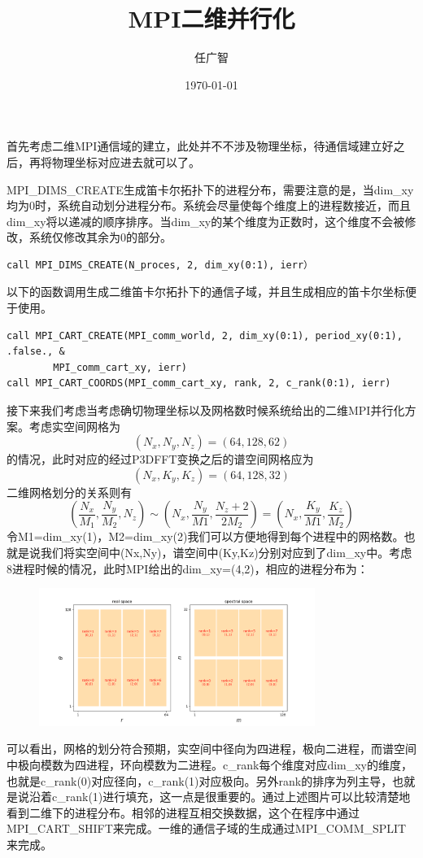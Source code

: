 \documentclass[11pt,a4paper]{article}
\title{MPI二维并行化}
\author{任广智}
\date{\today}
\begin{document}
	
\maketitle

首先考虑二维MPI通信域的建立，此处并不不涉及物理坐标，待通信域建立好之后，再将物理坐标对应进去就可以了。

MPI_DIMS_CREATE生成笛卡尔拓扑下的进程分布，需要注意的是，当dim_xy均为0时，系统自动划分进程分布。系统会尽量使每个维度上的进程数接近，而且dim_xy将以递减的顺序排序。当dim_xy的某个维度为正数时，这个维度不会被修改，系统仅修改其余为0的部分。
\begin{lstlisting}
call MPI_DIMS_CREATE(N_proces, 2, dim_xy(0:1), ierr）
\end{lstlisting}

以下的函数调用生成二维笛卡尔拓扑下的通信子域，并且生成相应的笛卡尔坐标便于使用。
\begin{lstlisting}
call MPI_CART_CREATE(MPI_comm_world, 2, dim_xy(0:1), period_xy(0:1), .false., &
		MPI_comm_cart_xy, ierr)
call MPI_CART_COORDS(MPI_comm_cart_xy, rank, 2, c_rank(0:1), ierr)
\end{lstlisting}

接下来我们考虑当考虑确切物理坐标以及网格数时候系统给出的二维MPI并行化方案。考虑实空间网格为$$(N_x,N_y,N_z)=(64,128,62)$$的情况，此时对应的经过P3DFFT变换之后的谱空间网格应为$$(N_x,K_y,K_z)=(64,128,32)$$
二维网格划分的关系则有
$$(\frac{N_x}{M_1},\frac{N_y}{M_2},N_z) \sim (N_x,\frac{N_y}{M1},\frac{N_z+2}{2M_2})=(N_x,\frac{K_y}{M1},\frac{K_z}{M_2})$$
令M1=dim_xy(1)，M2=dim_xy(2)我们可以方便地得到每个进程中的网格数。也就是说我们将实空间中(Nx,Ny)，谱空间中(Ky,Kz)分别对应到了dim_xy中。考虑8进程时候的情况，此时MPI给出的dim_xy=(4,2)，相应的进程分布为：
\begin{figure}[H]
	\centering
	\includegraphics[width=0.8\textwidth]{./np8.png}
	\caption{}
\end{figure}
可以看出，网格的划分符合预期，实空间中径向为四进程，极向二进程，而谱空间中极向模数为四进程，环向模数为二进程。c_rank每个维度对应dim_xy的维度，也就是c_rank(0)对应径向，c_rank(1)对应极向。另外rank的排序为列主导，也就是说沿着c_rank(1)进行填充，这一点是很重要的。通过上述图片可以比较清楚地看到二维下的进程分布。相邻的进程互相交换数据，这个在程序中通过MPI_CART_SHIFT来完成。一维的通信子域的生成通过MPI_COMM_SPLIT来完成。
\end{document}
